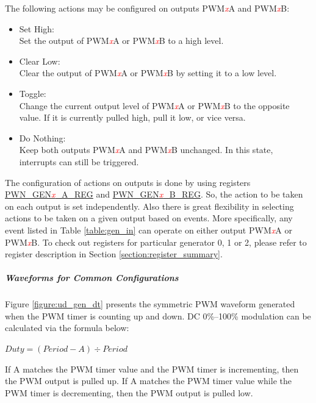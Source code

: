 \documentclass[main\_\_EN.tex]{subfiles}
\begin{document}
The following actions may be configured on outputs PWM\textcolor{red}{\it{x}}A and PWM\textcolor{red}{\it{x}}B:
\begin{itemize}
    \item Set High:\\
    Set the output of PWM\textcolor{red}{\it{x}}A or PWM\textcolor{red}{\it{x}}B to a high level.
    \item Clear Low:\\
    Clear the output of PWM\textcolor{red}{\it{x}}A or PWM\textcolor{red}{\it{x}}B by setting it to a low level.
    \item Toggle:\\
    Change the current output level of PWM\textcolor{red}{\it{x}}A or PWM\textcolor{red}{\it{x}}B to the opposite value. If it is currently pulled high, pull it low, or vice versa.
    \item Do Nothing:\\
    Keep both outputs PWM\textcolor{red}{\it{x}}A and PWM\textcolor{red}{\it{x}}B unchanged. In this state, interrupts can still be triggered.
\end{itemize}

The configuration of actions on outputs is done by using registers \hyperref[regdesc:PWMGEN0AREG]{PWN\_GEN\textcolor{red}{\it{x}}\_A\_REG} and \hyperref[regdesc:PWMGEN0BREG]{PWN\_GEN\textcolor{red}{\it{x}}\_B\_REG}. So, the action to be taken on each output is set independently. Also there is great flexibility in selecting actions to be taken on a given output based on events. More specifically, any event listed in Table \ref{table:gen_in} can operate on either output PWM\textcolor{red}{\it{x}}A or PWM\textcolor{red}{\it{x}}B. To check out registers for particular generator 0, 1 or 2, please refer to register description in Section \ref{section:register_summary}.

\subparagraph{Waveforms for Common Configurations}
Figure \ref{figure:ud_gen_dt} presents the symmetric PWM waveform generated when the PWM timer is counting up and down. DC 0\%–100\% modulation can be calculated via the formula below:

\begin{center}
$Duty =  (Period - A) \div Period$
\end{center}

If A matches the PWM timer value and the PWM timer is incrementing, then the PWM output is pulled up. If A matches the PWM timer value while the PWM timer is decrementing, then the PWM output is pulled low.
\end{document}
